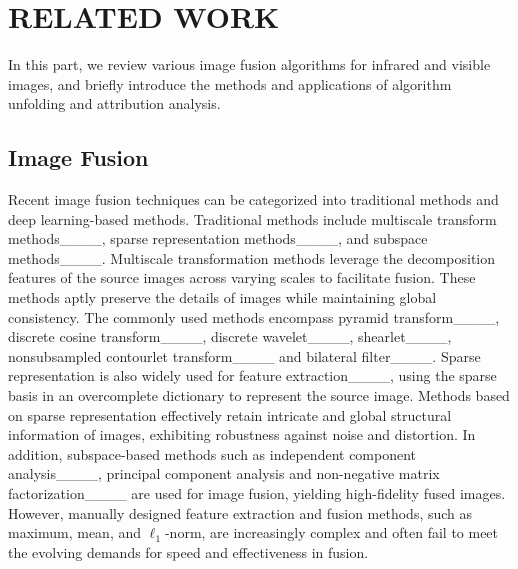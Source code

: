 \section{RELATED WORK}
\label{sec:2}
In this part, we review various image fusion algorithms for infrared and visible images, and briefly introduce the methods and applications of algorithm unfolding and attribution analysis.
\subsection{Image Fusion}
Recent image fusion techniques can be categorized into traditional methods and deep learning-based methods.
Traditional methods include multiscale transform methods____, sparse representation methods____, and subspace methods____.
Multiscale transformation methods leverage the decomposition features of the source images across varying scales to facilitate fusion. 
These methods aptly preserve the details of images while maintaining global consistency.
The commonly used methods encompass pyramid transform____, discrete cosine transform____, discrete wavelet____, shearlet____, nonsubsampled contourlet transform____ and bilateral filter____.
Sparse representation is also widely used for feature extraction____, using the sparse basis in an overcomplete dictionary to represent the source image. 
Methods based on sparse representation effectively retain intricate and global structural information of images, exhibiting robustness against noise and distortion.
In addition, subspace-based methods such as independent component analysis____, principal component analysis and non-negative matrix factorization____ are used for image fusion, yielding high-fidelity fused images.
However, manually designed feature extraction and fusion methods, such as maximum, mean, and $\ell_1$-norm, are increasingly complex and often fail to meet the evolving demands for speed and effectiveness in fusion.

